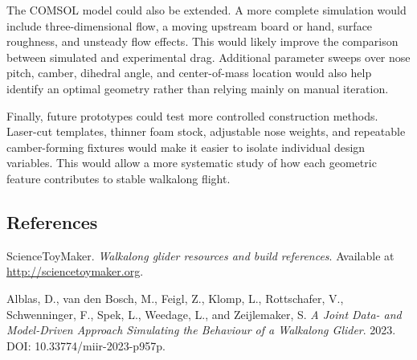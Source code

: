 \documentclass[10pt]{article}
\begin{document}
The COMSOL model could also be extended. A more complete simulation would include three-dimensional flow, a moving upstream board or hand, surface roughness, and unsteady flow effects. This would likely improve the comparison between simulated and experimental drag. Additional parameter sweeps over nose pitch, camber, dihedral angle, and center-of-mass location would also help identify an optimal geometry rather than relying mainly on manual iteration.

Finally, future prototypes could test more controlled construction methods. Laser-cut templates, thinner foam stock, adjustable nose weights, and repeatable camber-forming fixtures would make it easier to isolate individual design variables. This would allow a more systematic study of how each geometric feature contributes to stable walkalong flight.

\subsection*{References}
\begin{enumerate}[label={[\arabic*]}]
\item ScienceToyMaker. \textit{Walkalong glider resources and build references}. Available at \url{http://sciencetoymaker.org}.
\item Alblas, D., van den Bosch, M., Feigl, Z., Klomp, L., Rottschafer, V., Schwenninger, F., Spek, L., Weedage, L., and Zeijlemaker, S. \textit{A Joint Data- and Model-Driven Approach Simulating the Behaviour of a Walkalong Glider}. 2023. DOI: 10.33774/miir-2023-p957p.
\end{enumerate}
\end{document}
